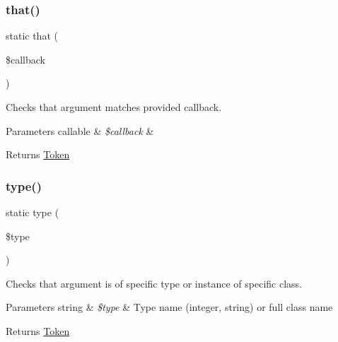 \subsubsection{\texorpdfstring{that()}{that()}}
{\footnotesize\ttfamily static that (\begin{DoxyParamCaption}\item[{}]{\$callback }\end{DoxyParamCaption})\hspace{0.3cm}{\ttfamily [static]}}

Checks that argument matches provided callback.


\begin{DoxyParams}[1]{Parameters}
callable & {\em \$callback} & \\
\hline
\end{DoxyParams}
\begin{DoxyReturn}{Returns}
\mbox{\hyperlink{namespace_prophecy_1_1_argument_1_1_token}{Token}} 
\end{DoxyReturn}
\mbox{\label{class_prophecy_1_1_argument_ab1d400a505a0a37507d931b8feba7804}} 
\subsubsection{\texorpdfstring{type()}{type()}}
{\footnotesize\ttfamily static type (\begin{DoxyParamCaption}\item[{}]{\$type }\end{DoxyParamCaption})\hspace{0.3cm}{\ttfamily [static]}}

Checks that argument is of specific type or instance of specific class.


\begin{DoxyParams}[1]{Parameters}
string & {\em \$type} & Type name ({\ttfamily integer}, {\ttfamily string}) or full class name\\
\hline
\end{DoxyParams}
\begin{DoxyReturn}{Returns}
\mbox{\hyperlink{namespace_prophecy_1_1_argument_1_1_token}{Token}} 
\end{DoxyReturn}
\mbox{\label{class_prophecy_1_1_argument_a687f0c1c1d42a06901f4f4fb58d766f3}} 
